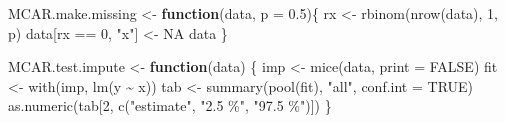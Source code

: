 \documentclass[
]{article}
\newenvironment{Shaded}{\begin{snugshade}}{\end{snugshade}}
\newcommand{\AttributeTok}[1]{\textcolor[rgb]{0.77,0.63,0.00}{#1}}
\newcommand{\ConstantTok}[1]{\textcolor[rgb]{0.00,0.00,0.00}{#1}}
\newcommand{\ControlFlowTok}[1]{\textcolor[rgb]{0.13,0.29,0.53}{\textbf{#1}}}
\newcommand{\DecValTok}[1]{\textcolor[rgb]{0.00,0.00,0.81}{#1}}
\newcommand{\FloatTok}[1]{\textcolor[rgb]{0.00,0.00,0.81}{#1}}
\newcommand{\FunctionTok}[1]{\textcolor[rgb]{0.00,0.00,0.00}{#1}}
\newcommand{\NormalTok}[1]{#1}
\newcommand{\OtherTok}[1]{\textcolor[rgb]{0.56,0.35,0.01}{#1}}
\newcommand{\SpecialCharTok}[1]{\textcolor[rgb]{0.00,0.00,0.00}{#1}}
\newcommand{\StringTok}[1]{\textcolor[rgb]{0.31,0.60,0.02}{#1}}
\begin{document}
\begin{Shaded}
\begin{Highlighting}[]
\NormalTok{MCAR.make.missing }\OtherTok{\textless{}{-}} \ControlFlowTok{function}\NormalTok{(data, }\AttributeTok{p =} \FloatTok{0.5}\NormalTok{)\{}
\NormalTok{  rx }\OtherTok{\textless{}{-}} \FunctionTok{rbinom}\NormalTok{(}\FunctionTok{nrow}\NormalTok{(data), }\DecValTok{1}\NormalTok{, p)}
\NormalTok{  data[rx }\SpecialCharTok{==} \DecValTok{0}\NormalTok{, }\StringTok{"x"}\NormalTok{] }\OtherTok{\textless{}{-}} \ConstantTok{NA}
\NormalTok{  data}
\NormalTok{\}}
\end{Highlighting}
\end{Shaded}

\begin{Shaded}
\begin{Highlighting}[]
\NormalTok{MCAR.test.impute }\OtherTok{\textless{}{-}} \ControlFlowTok{function}\NormalTok{(data) \{}
\NormalTok{  imp }\OtherTok{\textless{}{-}} \FunctionTok{mice}\NormalTok{(data, }\AttributeTok{print =} \ConstantTok{FALSE}\NormalTok{)}
\NormalTok{  fit }\OtherTok{\textless{}{-}} \FunctionTok{with}\NormalTok{(imp, }\FunctionTok{lm}\NormalTok{(y }\SpecialCharTok{\textasciitilde{}}\NormalTok{ x))}
\NormalTok{  tab }\OtherTok{\textless{}{-}} \FunctionTok{summary}\NormalTok{(}\FunctionTok{pool}\NormalTok{(fit), }\StringTok{"all"}\NormalTok{, }\AttributeTok{conf.int =} \ConstantTok{TRUE}\NormalTok{)}
  \FunctionTok{as.numeric}\NormalTok{(tab[}\DecValTok{2}\NormalTok{, }\FunctionTok{c}\NormalTok{(}\StringTok{"estimate"}\NormalTok{, }\StringTok{"2.5 \%"}\NormalTok{, }\StringTok{"97.5 \%"}\NormalTok{)])}
\NormalTok{\}}
\end{Highlighting}
\end{Shaded}
\end{document}
